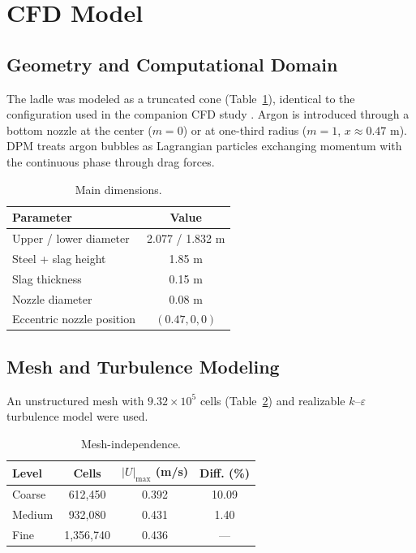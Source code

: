 \documentclass[12pt,a4paper]{article}
\begin{document}
\section{CFD Model}

\subsection{Geometry and Computational Domain}
The ladle was modeled as a truncated cone (Table~\ref{tab:geometry}), identical to the configuration used in the companion CFD study \cite{liu2026cfd}. Argon is introduced through a bottom nozzle at the center ($m=0$) or at one-third radius ($m=1$, $x\approx 0.47$ m). DPM treats argon bubbles as Lagrangian particles exchanging momentum with the continuous phase through drag forces.

\begin{table}[h]
\centering
\caption{Main dimensions.}
\label{tab:geometry}
\begin{tabular}{lc}
\toprule Parameter & Value \\ \midrule
Upper / lower diameter & 2.077 / 1.832 m \\
Steel + slag height & 1.85 m \\
Slag thickness & 0.15 m \\
Nozzle diameter & 0.08 m \\
Eccentric nozzle position & $(0.47, 0, 0)$ \\
\bottomrule
\end{tabular}
\end{table}

\subsection{Mesh and Turbulence Modeling}
An unstructured mesh with $9.32\times 10^{5}$ cells (Table~\ref{tab:mesh}) and realizable $k$--$\varepsilon$ turbulence model \cite{shih1995new} were used.

\begin{table}[h]
\centering
\caption{Mesh-independence.}
\label{tab:mesh}
\begin{tabular}{lccc}
\toprule Level & Cells & $|U|_{\max}$ (m/s) & Diff. (\%) \\ \midrule
Coarse  & 612,450  & 0.392 & 10.09 \\
Medium  & 932,080  & 0.431 & 1.40 \\
Fine    & 1,356,740 & 0.436 & --- \\
\bottomrule
\end{tabular}
\end{table}
\end{document}
